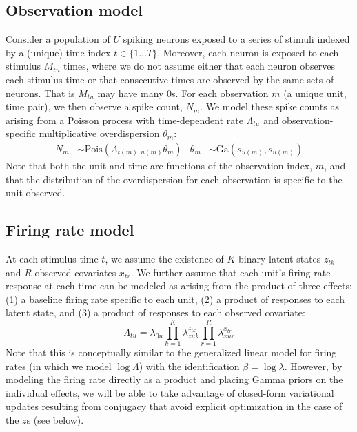 \documentclass{article} %
\begin{document}
\subsection{Observation model}
Consider a population of $U$ spiking neurons exposed to a series of stimuli indexed by a (unique) time index $t\in \lbrace 1\ldots T\rbrace$. Moreover, each neuron is exposed to each stimulus $M_{tu}$ times, where we do not assume either that each neuron observes each stimulus time or that consecutive times are observed by the same sets of neurons. That is $M_{tu}$ may have many 0s. For each observation $m$ (a unique unit, time pair), we then observe a spike count, $N_m$. We model these spike counts as arising from a Poisson process with time-dependent rate $\Lambda_{tu}$ and observation-specific multiplicative overdispersion $\theta_m$:
\begin{align}
    \label{obs_model}
    N_{m} &\sim \text{Pois}(\Lambda_{t(m), u(m)} \theta_m) &
    \theta_m &\sim \text{Ga}(s_{u(m)}, s_{u(m)})
\end{align}
Note that both the unit and time are functions of the observation index, $m$, and that the distribution of the overdispersion for each observation is specific to the unit observed. 

\subsection{Firing rate model}
At each stimulus time $t$, we assume the existence of $K$ binary latent states $z_{tk}$ and $R$ observed covariates $x_{tr}$. We further assume that each unit's firing rate response at each time can be modeled as arising from the product of three effects: (1) a baseline firing rate specific to each unit, (2) a product of responses to each latent state, and (3) a product of responses to each observed covariate:
\begin{equation}
    \label{fr_model}
    \Lambda_{tu} = \lambda_{0u} \prod_{k = 1}^K \lambda_{zuk}^{z_{tk}}  
    \prod_{r = 1}^R \lambda_{xur}^{x_{tr}}   
\end{equation} 
Note that this is conceptually similar to the generalized linear model for firing rates (in which we model $\log \Lambda$) with the identification $\beta = \log \lambda$. However, by modeling the firing rate directly as a product and placing Gamma priors on the individual effects, we will be able to take advantage of closed-form variational updates resulting from conjugacy that avoid explicit optimization in the case of the $z$s (see below). 
\end{document}
